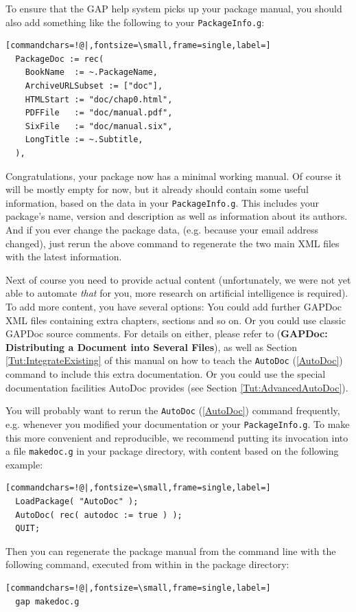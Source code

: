 \documentclass[a4paper,11pt]{report}
\begin{document}
{{ To ensure that the \textsf{GAP} help system picks up your package manual, you should also add something like
the following to your \texttt{PackageInfo.g}: 
\begin{Verbatim}[commandchars=!@|,fontsize=\small,frame=single,label=]
  PackageDoc := rec(
    BookName  := ~.PackageName,
    ArchiveURLSubset := ["doc"],
    HTMLStart := "doc/chap0.html",
    PDFFile   := "doc/manual.pdf",
    SixFile   := "doc/manual.six",
    LongTitle := ~.Subtitle,
  ),
\end{Verbatim}
 Congratulations, your package now has a minimal working manual. Of course it
will be mostly empty for now, but it already should contain some useful
information, based on the data in your \texttt{PackageInfo.g}. This includes your package's name, version and description as well as
information about its authors. And if you ever change the package data, (e.g.
because your email address changed), just re\texttt{}run the above
command to regenerate the two main XML files with the latest information. 

 Next of course you need to provide actual content (unfortunately, we were not
yet able to automate \emph{that} for you, more research on artificial intelligence is required). To add more
content, you have several options: You could add further \textsf{GAPDoc} XML files containing extra chapters, sections and so on. Or you could use
classic \textsf{GAPDoc} source comments. For details on either, please refer to  (\textbf{GAPDoc: Distributing a Document into Several Files}), as well as Section \ref{Tut:IntegrateExisting} of this manual on how to teach the \texttt{AutoDoc} (\ref{AutoDoc}) command to include this extra documentation. Or you could use the special
documentation facilities \textsf{AutoDoc} provides (see Section \ref{Tut:AdvancedAutoDoc}). 

 You will probably want to re\texttt{}run the \texttt{AutoDoc} (\ref{AutoDoc}) command frequently, e.g. whenever you modified your documentation or your \texttt{PackageInfo.g}. To make this more convenient and reproducible, we recommend putting its
invocation into a file \texttt{makedoc.g} in your package  directory, with content based on the following example: 
\begin{Verbatim}[commandchars=!@|,fontsize=\small,frame=single,label=]
  LoadPackage( "AutoDoc" );
  AutoDoc( rec( autodoc := true ) );
  QUIT;
\end{Verbatim}
 Then you can regenerate the package manual from the command line with the
following command, executed from within in the package directory: 
\begin{Verbatim}[commandchars=!@|,fontsize=\small,frame=single,label=]
  gap makedoc.g
\end{Verbatim}
 }

}
\end{document}
